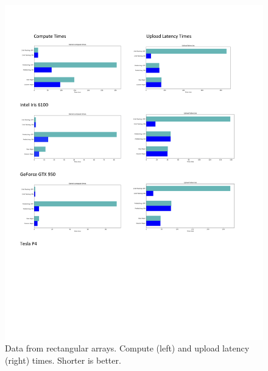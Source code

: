 \documentclass[conference]{IEEEtran}
\begin{document}
\begin{figure}
\centering
\includegraphics[scale=0.45]{misc_data.jpg}
\caption{Data from rectangular arrays. Compute (left) and upload latency (right) times. Shorter is better.}
\end{figure}

\clearpage
\newpage
\end{document}
